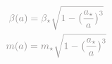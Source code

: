 \documentclass[preview]{standalone}
\begin{document}
\begin{gather}
\notag
\textcolor{Gray}{\beta(a) = \beta_{\star} \sqrt{1-\bigl( \frac{a_{\star}}{a} \bigr)^3}} \\ 
\notag
\textcolor{Gray}{m(a) = m_{\star} \sqrt{1-\bigl( \frac{a_{\star}}{a} \bigr)^3}} 
\end{gather}
\end{document}
